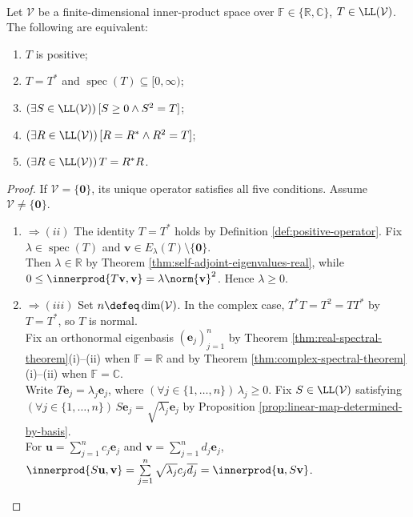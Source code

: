 \begin{theorem} \label{thm:positive-operator-characterization} \\
Let $\mathcal{V}$ be a finite-dimensional inner-product space over $\mathbb{F}\in\{\mathbb{R},\mathbb{C}\}$, $T\in\LL(\mathcal{V})$. The following are equivalent:
\begin{enumerate}[label=(\roman*)]
\setlength{\itemsep}{0pt}
\item $T$ is positive;
\item $T=T^*$ and $\operatorname{spec}(T)\subseteq[0,\infty)$;
\item $(\exists S\in\LL(\mathcal{V}))\,[S\geq0\land S^2=T]$;
\item $(\exists R\in\LL(\mathcal{V}))\,[R=R^*\land R^2=T]$;
\item $(\exists R\in\LL(\mathcal{V}))\,T=R^*R$.
\end{enumerate}
\begin{proof}
If $\mathcal{V}=\{\mathbf{0}\}$, its unique operator satisfies all five conditions. Assume $\mathcal{V}\neq\{\mathbf{0}\}$.
\begin{enumerate}[label=(\roman*)]
\setlength{\itemsep}{0pt}
\item[$(i)$] $\Rightarrow (ii)$ The identity $T=T^*$ holds by Definition \ref{def:positive-operator}. Fix $\lambda\in\operatorname{spec}(T)$ and $\mathbf{v}\in E_{\lambda}(T)\setminus\{\mathbf{0}\}$.\\
Then $\lambda\in\mathbb{R}$ by Theorem \ref{thm:self-adjoint-eigenvalues-real}, while $0\leq\innerprod{T\mathbf{v},\mathbf{v}}=\lambda\norm{\mathbf{v}}^2$. Hence $\lambda\geq0$.
\item[$(ii)$] $\Rightarrow (iii)$ Set $n\defeq\dim(\mathcal{V})$. In the complex case, $T^*T=T^2=TT^*$ by $T=T^*$, so $T$ is normal.\\
Fix an orthonormal eigenbasis $(\mathbf{e}_j)_{j=1}^{n}$ by Theorem \ref{thm:real-spectral-theorem}(i)--(ii) when $\mathbb{F}=\mathbb{R}$ and by Theorem \ref{thm:complex-spectral-theorem}(i)--(ii) when $\mathbb{F}=\mathbb{C}$.\\
Write $T\mathbf{e}_j=\lambda_j\mathbf{e}_j$, where $(\forall j\in\{1,\ldots,n\})\,\lambda_j\geq0$. Fix $S\in\LL(\mathcal{V})$ satisfying $(\forall j\in\{1,\ldots,n\})\,S\mathbf{e}_j=\sqrt{\lambda_j}\mathbf{e}_j$ by Proposition \ref{prop:linear-map-determined-by-basis}.\\
For $\mathbf{u}=\sum\limits_{j=1}^{n}c_j\mathbf{e}_j$ and $\mathbf{v}=\sum\limits_{j=1}^{n}d_j\mathbf{e}_j$, $\innerprod{S\mathbf{u},\mathbf{v}}=\sum\limits_{j=1}^{n}\sqrt{\lambda_j}c_j\overline{d_j}=\innerprod{\mathbf{u},S\mathbf{v}}$.\\

\end{enumerate}
\end{proof}
\end{theorem}
